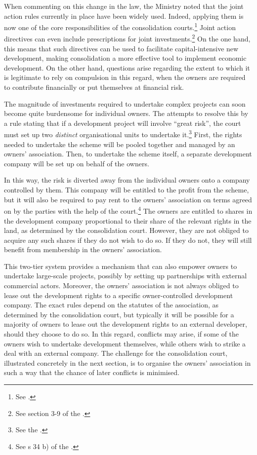 When commenting on this change in the law, the Ministry noted that the joint action rules currently in place have been widely used. Indeed, applying them is now one of the core responsibilities of the consolidation courts.\footnote{See \cite[146]{prop12}.} Joint action directives can even include prescriptions for joint investments.\footnote{See section 3-9 of the \cite{lca13}.} On the one hand, this means that such directives can be used to facilitate capital-intensive new development, making consolidation a more effective tool to implement economic development. On the other hand, questions arise regarding the extent to which it is legitimate to rely on compulsion in this regard, when the owners are required to contribute financially or put themselves at financial risk.

The magnitude of investments required to undertake complex projects can soon become quite burdensome for individual owners. The \cite{lca79} attempts to resolve this by a rule stating that if a development project will involve ``great risk'', the court must set up two \emph{distinct} organisational units to undertake it.\footnote{See the \dni\cite[34 b)|42]{lca79}.} First, the rights needed to undertake the scheme will be pooled together and managed by an owners' association. Then, to undertake the scheme itself, a separate development company will be set up on behalf of the owners.

In this way, the risk is diverted away from the individual owners onto a company controlled by them. This company will be entitled to the profit from the scheme, but it will also be required to pay rent to the owners' association on terms agreed on by the parties with the help of the court.\footnote{See s 34 b) of the \cite{lca79}.} The owners are entitled to shares in the development company proportional to their share of the relevant rights in the land, as determined by the consolidation court. However, they are not obliged to acquire any such shares if they do not wish to do so. If they do not, they will still benefit from membership in the owners' association.

This two-tier system provides a mechanism that can also empower owners to undertake large-scale projects, possibly by setting up partnerships with external commercial actors. Moreover, the owners' association is not always obliged to lease out the development rights to a specific owner-controlled development company. The exact rules depend on the statutes of the association, as determined by the consolidation court, but typically it will be possible for a majority of owners to lease out the development rights to an external developer, should they choose to do so. In this regard, conflicts may arise, if some of the owners wish to undertake development themselves, while others wish to strike a deal with an external company. The challenge for the consolidation court, illustrated concretely in the next section, is to organise the owners' association in such a way that the chance of later conflicts is minimised.

